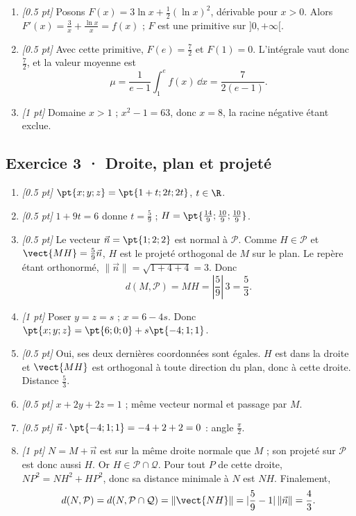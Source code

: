 \begin{enumerate}
\item \textit{[\num{0,5} pt]} Posons $F(x)=3\ln x+\frac12(\ln x)^2$, dérivable pour $x>0$. Alors $F'(x)=\frac{3}{x}+\frac{\ln x}{x}=f(x)$ ; $F$ est une primitive sur $]0,+\infty[$.

\item \textit{[\num{0,5} pt]} Avec cette primitive, $F(e)=\frac{7}{2}$ et $F(1)=0$. L'intégrale vaut donc $\frac{7}{2}$, et la valeur moyenne est
\[\mu=\frac{1}{e-1}\int_1^e f(x)\,\dd x=\frac{7}{2(e-1)}.\]

\item \textit{[1 pt]} Domaine $x>1$ ; $x^2-1=63$, donc $x=8$, la racine négative étant exclue.

\end{enumerate}

\subsection*{Exercice 3 · Droite, plan et projeté}\begin{enumerate}

\item \textit{[\num{0,5} pt]} $\pt{x;y;z}=\pt{1+t;2t;2t}$, $t\in\R$.

\item \textit{[\num{0,5} pt]} $1+9t=6$ donne $t=\frac{5}{9}$ ; $H=\pt{\frac{14}{9};\frac{10}{9};\frac{10}{9}}$.

\item \textit{[\num{0,5} pt]} Le vecteur $\vec n=\pt{1;2;2}$ est normal à $\mathcal P$. Comme $H\in\mathcal P$ et $\vect{MH}=\frac{5}{9}\vec n$, $H$ est le projeté orthogonal de $M$ sur le plan. Le repère étant orthonormé, $\|\vec n\|=\sqrt{1+4+4}=3$. Donc
\[d(M,\mathcal P)=MH=|\frac{5}{9}|\,3=\frac{5}{3}.\]

\item \textit{[1 pt]} Poser $y=z=s$ ; $x=6-4s$. Donc $\pt{x;y;z}=\pt{6;0;0}+s\pt{-4;1;1}$.

\item \textit{[\num{0,5} pt]} Oui, ses deux dernières coordonnées sont égales. $H$ est dans la droite et $\vect{MH}$ est orthogonal à toute direction du plan, donc à cette droite. Distance $\frac{5}{3}$.

\item \textit{[\num{0,5} pt]} $x+2y+2z=1$ ; même vecteur normal et passage par $M$.

\item \textit{[\num{0,5} pt]} $\vec n\cdot\pt{-4;1;1}=-4+2+2=0$ : angle $\frac{\pi}{2}$.

\item \textit{[1 pt]} $N=M+\vec n$ est sur la même droite normale que $M$ ; son projeté sur $\mathcal P$ est donc aussi $H$. Or $H\in\mathcal P\cap\mathcal Q$. Pour tout $P$ de cette droite, $NP^2=NH^2+HP^2$, donc sa distance minimale à $N$ est $NH$. Finalement,
\[d(N,\mathcal P)=d(N,\mathcal P\cap\mathcal Q)=\|\vect{NH}\|=|\frac{5}{9}-1|\,\|\vec n\|=\frac{4}{3}.\]

\end{enumerate}

